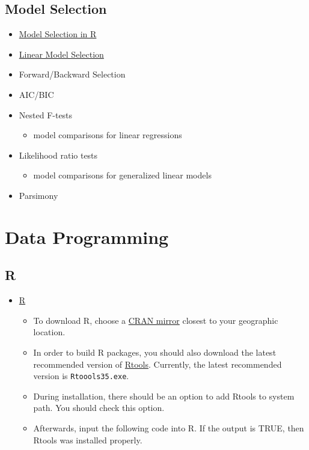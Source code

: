 \documentclass[]{book}
\providecommand{\tightlist}{%
  \setlength{\itemsep}{0pt}\setlength{\parskip}{0pt}}
\begin{document}
\hypertarget{model-selection}{%
\section{Model Selection}\label{model-selection}}

\begin{itemize}
\item
  \href{http://r-statistics.co/Model-Selection-in-R.html}{Model Selection in R}
\item
  \href{https://uc-r.github.io/model_selection}{Linear Model Selection}
\item
  Forward/Backward Selection
\item
  AIC/BIC
\item
  Nested F-tests

  \begin{itemize}
  \tightlist
  \item
    model comparisons for linear regressions
  \end{itemize}
\item
  Likelihood ratio tests

  \begin{itemize}
  \tightlist
  \item
    model comparisons for generalized linear models
  \end{itemize}
\item
  Parsimony
\end{itemize}

\hypertarget{data-programming}{%
\chapter*{Data Programming}\label{data-programming}}

\hypertarget{r}{%
\section{R}\label{r}}

\begin{itemize}
\item
  \href{https://www.r-project.org/}{R}

  \begin{itemize}
  \tightlist
  \item
    To download R, choose a \href{https://cran.r-project.org/mirrors.html}{CRAN mirror} closest to your geographic location.
  \item
    In order to build R packages, you should also download the latest recommended version of \href{https://cran.r-project.org/bin/windows/Rtools/}{Rtools}. Currently, the latest recommended version is \texttt{Rtoools35.exe}.
  \item
    During installation, there should be an option to add Rtools to system path. You should check this option.
  \item
    Afterwards, input the following code into R. If the output is TRUE, then Rtools was installed properly.
  \end{itemize}
\end{itemize}
\end{document}
